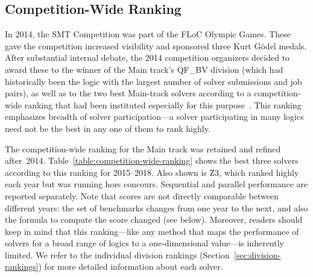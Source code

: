 \documentclass[dvipsnames,table,twoside,11pt]{article}
\begin{document}







\subsection{Competition-Wide Ranking}
\label{sec:floc}

In 2014, the SMT Competition was part of the FLoC Olympic Games.
These gave the competition increased visibility and sponsored three
Kurt G\"odel medals.  After substantial internal debate, the 2014
competition organizers decided to award these to the winner of the
Main track's QF\_BV division (which had historically been the logic
with the largest number of solver submissions and job pairs), as well
as to the two best Main-track solvers according to a competition-wide
ranking that had been instituted especially for this
purpose~\cite{CDW14}.  This ranking emphasizes breadth of solver
participation---a solver participating in many logics need not be the
best in any one of them to rank highly.

The competition-wide ranking for the Main track was retained and
refined after~2014.  Table~\ref{table:competition-wide-ranking} shows
the best three solvers according to this ranking for 2015--2018.  Also
shown is Z3, which ranked highly each year but was running hors
concours.  Sequential and parallel performance are reported
separately.
%
Note that scores are not directly comparable between different years:
the set of benchmarks changes from one year to the next, and also the
formula to compute the score changed (see below).  Moreover, readers
should keep in mind that this ranking---like any method that maps the
performance of solvers for a broad range of logics to a
one-dimensional value---is inherently limited.  We refer to the
individual division rankings (Section~\ref{sec:division-rankings}) for
more detailed information about each solver.
\end{document}
